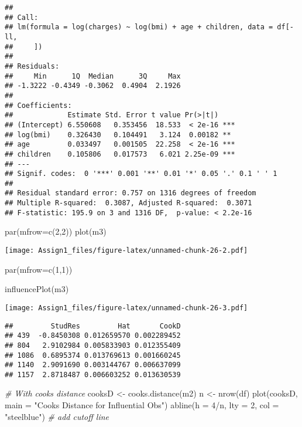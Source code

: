 \documentclass[
]{article}
\newenvironment{Shaded}{\begin{snugshade}}{\end{snugshade}}
\newcommand{\AttributeTok}[1]{\textcolor[rgb]{0.77,0.63,0.00}{#1}}
\newcommand{\CommentTok}[1]{\textcolor[rgb]{0.56,0.35,0.01}{\textit{#1}}}
\newcommand{\DecValTok}[1]{\textcolor[rgb]{0.00,0.00,0.81}{#1}}
\newcommand{\FunctionTok}[1]{\textcolor[rgb]{0.00,0.00,0.00}{#1}}
\newcommand{\NormalTok}[1]{#1}
\newcommand{\OtherTok}[1]{\textcolor[rgb]{0.56,0.35,0.01}{#1}}
\newcommand{\SpecialCharTok}[1]{\textcolor[rgb]{0.00,0.00,0.00}{#1}}
\newcommand{\StringTok}[1]{\textcolor[rgb]{0.31,0.60,0.02}{#1}}
\begin{document}
\begin{verbatim}
## 
## Call:
## lm(formula = log(charges) ~ log(bmi) + age + children, data = df[-ll, 
##     ])
## 
## Residuals:
##     Min      1Q  Median      3Q     Max 
## -1.3222 -0.4349 -0.3062  0.4904  2.1926 
## 
## Coefficients:
##             Estimate Std. Error t value Pr(>|t|)    
## (Intercept) 6.550608   0.353456  18.533  < 2e-16 ***
## log(bmi)    0.326430   0.104491   3.124  0.00182 ** 
## age         0.033497   0.001505  22.258  < 2e-16 ***
## children    0.105806   0.017573   6.021 2.25e-09 ***
## ---
## Signif. codes:  0 '***' 0.001 '**' 0.01 '*' 0.05 '.' 0.1 ' ' 1
## 
## Residual standard error: 0.757 on 1316 degrees of freedom
## Multiple R-squared:  0.3087, Adjusted R-squared:  0.3071 
## F-statistic: 195.9 on 3 and 1316 DF,  p-value: < 2.2e-16
\end{verbatim}

\begin{Shaded}
\begin{Highlighting}[]
\FunctionTok{par}\NormalTok{(}\AttributeTok{mfrow=}\FunctionTok{c}\NormalTok{(}\DecValTok{2}\NormalTok{,}\DecValTok{2}\NormalTok{))}
\FunctionTok{plot}\NormalTok{(m3)}
\end{Highlighting}
\end{Shaded}

\texttt{[image: Assign1\_files/figure-latex/unnamed-chunk-26-2.pdf]}

\begin{Shaded}
\begin{Highlighting}[]
\FunctionTok{par}\NormalTok{(}\AttributeTok{mfrow=}\FunctionTok{c}\NormalTok{(}\DecValTok{1}\NormalTok{,}\DecValTok{1}\NormalTok{))}

\FunctionTok{influencePlot}\NormalTok{(m3)}
\end{Highlighting}
\end{Shaded}

\texttt{[image: Assign1\_files/figure-latex/unnamed-chunk-26-3.pdf]}

\begin{verbatim}
##         StudRes         Hat       CookD
## 439  -0.8450308 0.012659570 0.002289452
## 804   2.9102984 0.005833903 0.012355409
## 1086  0.6895374 0.013769613 0.001660245
## 1140  2.9091690 0.003144767 0.006637099
## 1157  2.8718487 0.006603252 0.013630539
\end{verbatim}

\begin{Shaded}
\begin{Highlighting}[]
\CommentTok{\# With cooks distance}
\NormalTok{cooksD }\OtherTok{\textless{}{-}} \FunctionTok{cooks.distance}\NormalTok{(m2)}
\NormalTok{n }\OtherTok{\textless{}{-}} \FunctionTok{nrow}\NormalTok{(df)}
\FunctionTok{plot}\NormalTok{(cooksD, }\AttributeTok{main =} \StringTok{"Cooks Distance for Influential Obs"}\NormalTok{)}
\FunctionTok{abline}\NormalTok{(}\AttributeTok{h =} \DecValTok{4}\SpecialCharTok{/}\NormalTok{n, }\AttributeTok{lty =} \DecValTok{2}\NormalTok{, }\AttributeTok{col =} \StringTok{"steelblue"}\NormalTok{) }\CommentTok{\# add cutoff line}
\end{Highlighting}
\end{Shaded}
\end{document}
